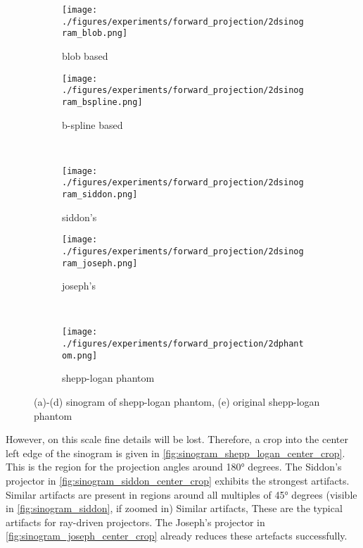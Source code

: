 \begin{figure}[h]
	\centering
	\begin{subfigure}[b]{0.45\textwidth}
		\centering
		\texttt{[image: ./figures/experiments/forward\_projection/2dsinogram\_blob.png]}
		\caption{blob based}\label{fig:sinogram_blob}
	\end{subfigure}
	\begin{subfigure}[b]{0.45\textwidth}
		\centering
		\texttt{[image: ./figures/experiments/forward\_projection/2dsinogram\_bspline.png]}
		\caption{b-spline based}\label{fig:sinogram_bspline}
	\end{subfigure} \\
	\begin{subfigure}[b]{0.45\textwidth}
		\centering
		\texttt{[image: ./figures/experiments/forward\_projection/2dsinogram\_siddon.png]}
		\caption{siddon's}\label{fig:sinogram_siddon}
	\end{subfigure}
	\begin{subfigure}[b]{0.45\textwidth}
		\centering
		\texttt{[image: ./figures/experiments/forward\_projection/2dsinogram\_joseph.png]}
		\caption{joseph's}\label{fig:sinogram_joseph}
	\end{subfigure} \\
	\begin{subfigure}[b]{0.45\textwidth}
		\centering
		\texttt{[image: ./figures/experiments/forward\_projection/2dphantom.png]}
		\caption{shepp-logan phantom}\label{fig:shepp_logan_phantom}
	\end{subfigure}
	\caption{(a)-(d) sinogram of shepp-logan phantom, (e) original shepp-logan phantom}%
	\label{fig:sinogram_shepp_logan}
\end{figure}

However, on this scale fine details will be lost. Therefore, a crop into the center left edge of the
sinogram is given in \autoref{fig:sinogram_shepp_logan_center_crop}. This is the region for the
projection angles around 180° degrees. The Siddon's projector in
\autoref{fig:sinogram_siddon_center_crop} exhibits the strongest artifacts. Similar artifacts are
present in regions around all multiples of 45° degrees (visible in \autoref{fig:sinogram_siddon}, if
zoomed in) Similar artifacts, These are the typical artifacts for ray-driven projectors. The
Joseph's projector in \autoref{fig:sinogram_joseph_center_crop} already reduces these artefacts
successfully.

